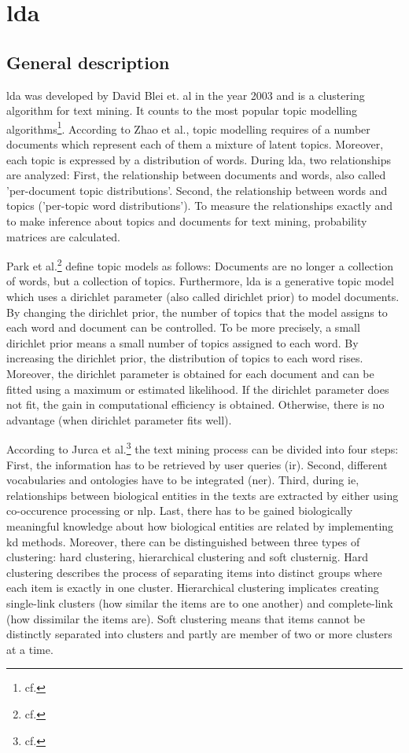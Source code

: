 \chapter{\gls{lda}}\label{lda}
\section{General description}\label{lda_description}
\gls{lda} was developed by David Blei et. al in the year 2003 and is a clustering algorithm for text mining. It counts to the most popular topic modelling algorithms\footnote{cf.\autocite{zhao_2016}}.
According to Zhao et al., topic modelling requires of a number documents which represent each of them a mixture of latent topics. Moreover, each topic is expressed by a distribution of words. During \gls{lda}, two relationships are analyzed: First, the relationship between documents and words, also called 'per-document topic distributions'. Second, the relationship between words and topics ('per-topic word distributions'). To measure the relationships exactly and to make inference about topics and documents for text mining, probability matrices are calculated.

Park et al.\footnote{cf.\autocite{park_2009}} define topic models as follows: Documents are no longer a collection of words, but a collection of topics. Furthermore, \gls{lda} is a generative topic model which uses a dirichlet parameter (also called dirichlet prior) to model documents. By changing the dirichlet prior, the number of topics that the model assigns to each word and document can be controlled. To be more precisely, a small dirichlet prior means a small number of topics assigned to each word. By increasing the dirichlet prior, the distribution of topics to each word rises. Moreover, the dirichlet parameter is obtained for each document and can be fitted using a maximum or estimated likelihood. If the dirichlet parameter does not fit, the gain in computational efficiency is obtained. Otherwise, there is no advantage (when dirichlet parameter fits well).

According to Jurca et al.\footnote{cf.\autocite{jurca_2016}} the text mining process can be divided into four steps: First, the information has to be retrieved by user queries (\gls{ir}). Second, different vocabularies and ontologies have to be integrated (\gls{ner}). Third, during \gls{ie}, relationships between biological entities in the texts are extracted by either using co-occurence processing or \gls{nlp}. Last, there has to be gained biologically meaningful knowledge about how biological entities are related by implementing \gls{kd} methods.
Moreover, there can be distinguished between three types of clustering: hard clustering, hierarchical clustering and soft clusternig. Hard clustering describes the process of separating items into distinct groups where each item is exactly in one cluster. Hierarchical clustering implicates creating single-link clusters (how similar the items are to one another) and complete-link (how dissimilar the items are). Soft clustering means that items cannot be distinctly separated into clusters and partly are member of two or more clusters at a time.  

